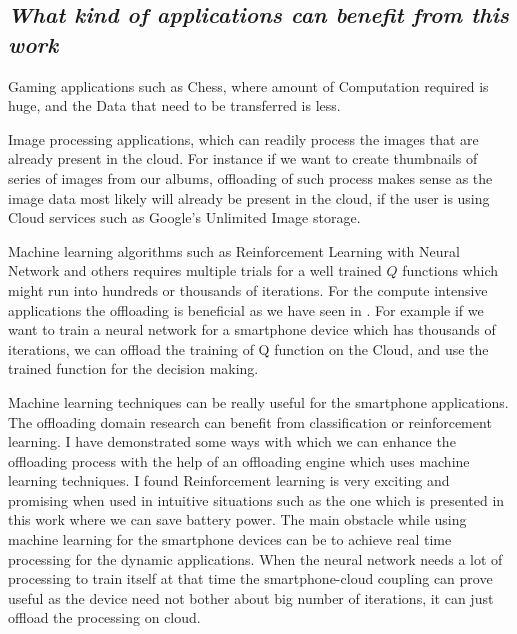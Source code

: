 \documentclass[12pt]{report}
\begin{document}
\subsection{\textit{What kind of applications can benefit from this work}}

Gaming applications such as Chess, where amount of Computation required is huge, and the Data that need to be transferred is less.

Image processing applications, which can readily process the images that are already present in the cloud. For instance if we want to create thumbnails of series of images from our albums, offloading of such process makes sense as the image data most likely will already be present in the cloud, if the user is using Cloud services such as Google's Unlimited Image storage.

Machine learning algorithms such as Reinforcement Learning with Neural Network and others requires multiple trials for a well trained $Q$ functions which might run into hundreds or thousands of iterations.
For the compute intensive applications the offloading is beneficial as we have seen in \cite{kumar2010cloud}. For example if we
want to train a neural network for a smartphone device which has thousands of iterations, we
can offload the training of Q function on the Cloud, and use the trained function for the decision making.
\par
Machine learning techniques can be really useful for the smartphone applications. The offloading domain research can benefit from classification or reinforcement learning. I have demonstrated some ways with which we can enhance the offloading process with the help
of an offloading engine which uses machine learning techniques. I found Reinforcement learning is very exciting and promising when used in intuitive situations such as the one which is presented in this work where we can save battery power. 
The main obstacle while using machine learning for the smartphone devices can be to achieve real time processing for the dynamic applications. When the neural network needs a lot of processing to train itself at that time the smartphone-cloud coupling can prove useful as the device need not bother about big number of iterations, it can just offload the processing on cloud. 




\end{document}
